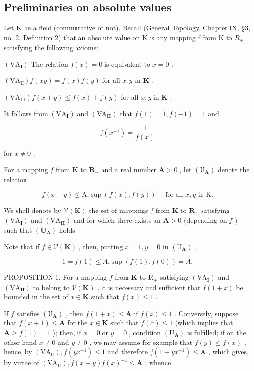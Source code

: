\subsection{Preliminaries on absolute values}

Let K be a field (commutative or not). Recall (General Topology, Chapter IX, §3, no. 2, Definition 2) that an absolute value on K is any mapping f from K to \(R_{+}\) satisfying the following axioms:

\((\mathrm{VA}_{\mathbf{I}})\) The relation \(f(x) = 0\) is equivalent to \(x = 0\) .

\((\mathrm{VA}_{\mathrm{II}}) f(xy) = f(x)f(y)\) for all \(x, y\) in \(\mathbf{K}\) .

\((\mathrm{VA}_{\mathrm{III}}) f(x + y) \leqslant f(x) + f(y)\) for all \(x, y\) in \(\mathbf{K}\) .

It follows from \((\mathrm{VA}_{\mathbf{I}})\) and \((\mathrm{VA}_{\mathbf{II}})\) that \(f(1) = 1, f(-1) = 1\) and

\[
f (x ^ {- 1}) = \frac {1}{f (x)}
\]

for \(x \neq 0\) .

For a mapping \(f\) from \(\mathbf{K}\) to \(\mathbf{R}_{+}\) and a real number \(\mathbf{A} > 0\) , let \((\mathrm{U}_{\mathbf{A}})\) denote the relation

\[
f (x + y) \leqslant \mathrm{A}. \sup (f (x), f (y)) \quad \text {   for   all   } x, y \text {   in   } \mathrm{K}.
\]

We shall denote by \(\mathcal{V}(\mathbf{K})\) the set of mappings \(f\) from \(\mathbf{K}\) to \(\mathbf{R}_{+}\) satisfying \((\mathrm{VA}_{\mathbf{I}})\) and \((\mathrm{VA}_{\mathbf{II}})\) and for which there exists an \(\mathbf{A} > 0\) (depending on \(f\) ) such that \((\mathbf{U}_{\mathbf{A}})\) holds.

Note that if \(f \in \mathcal{V}(\mathbf{K})\) , then, putting \(x = 1, y = 0\) in \((\mathrm{U}_{\mathbf{A}})\) ,

\[
1 = f (1) \leqslant A. \sup (f (1), f (0)) = A.
\]

PROPOSITION 1. For a mapping \(f\) from \(\mathbf{K}\) to \(\mathbf{R}_+\) satisfying \((\mathrm{VA}_{\mathbf{I}})\) and \((\mathrm{VA}_{\mathbf{II}})\) to belong to \(\mathcal{V}(\mathbf{K})\) , it is necessary and sufficient that \(f(1 + x)\) be bounded in the set of \(x \in \mathbf{K}\) such that \(f(x) \leqslant 1\) .

If \(f\) satisfies \((\mathrm{U}_{\mathbf{A}})\) , then \(f(1 + x) \leqslant \mathbf{A}\) if \(f(x) \leqslant 1\) . Conversely, suppose that \(f(x + 1) \leqslant \mathbf{A}\) for the \(x \in \mathbf{K}\) such that \(f(x) \leqslant 1\) (which implies that \(\mathbf{A} \geqslant f(1) = 1\) ); then, if \(x = 0\) or \(y = 0\) , condition \((\mathrm{U}_{\mathbf{A}})\) is fulfilled; if on the other hand \(x \neq 0\) and \(y \neq 0\) , we may assume for example that \(f(y) \leqslant f(x)\) , hence, by \((\mathrm{VA}_{\mathrm{II}}), f(yx^{-1}) \leqslant 1\) and therefore \(f(1 + yx^{-1}) \leqslant \mathbf{A}\) , which gives, by virtue of \((\mathrm{VA}_{\mathrm{II}}), f(x + y)f(x)^{-1} \leqslant \mathbf{A}\) ; whence


